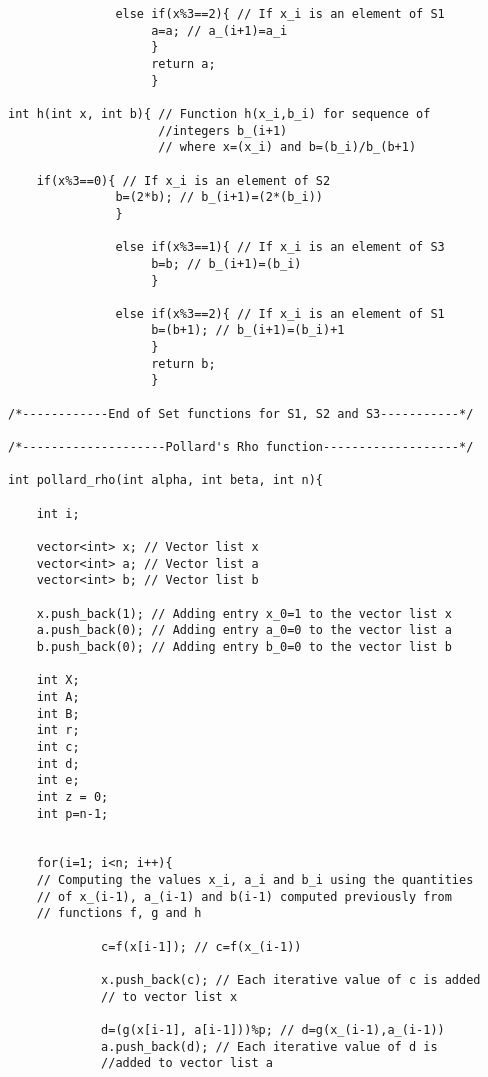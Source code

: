 \documentclass[iwp,first]{luthesis}
\begin{document}
\begin{verbatim}
               else if(x%3==2){ // If x_i is an element of S1
                    a=a; // a_(i+1)=a_i
                    } 
                    return a;      
                    }
                    
int h(int x, int b){ // Function h(x_i,b_i) for sequence of 
                     //integers b_(i+1)
                     // where x=(x_i) and b=(b_i)/b_(b+1)
    
    if(x%3==0){ // If x_i is an element of S2
               b=(2*b); // b_(i+1)=(2*(b_i))
               }
               
               else if(x%3==1){ // If x_i is an element of S3
                    b=b; // b_(i+1)=(b_i)
                    }
                    
               else if(x%3==2){ // If x_i is an element of S1
                    b=(b+1); // b_(i+1)=(b_i)+1
                    }
                    return b;
                    }
                                   
/*------------End of Set functions for S1, S2 and S3-----------*/

/*--------------------Pollard's Rho function-------------------*/

int pollard_rho(int alpha, int beta, int n){ 
    
    int i;
    
    vector<int> x; // Vector list x
    vector<int> a; // Vector list a
    vector<int> b; // Vector list b
    
    x.push_back(1); // Adding entry x_0=1 to the vector list x
    a.push_back(0); // Adding entry a_0=0 to the vector list a
    b.push_back(0); // Adding entry b_0=0 to the vector list b
    
    int X;
    int A;
    int B;
    int r;
    int c;
    int d;
    int e;
    int z = 0;
    int p=n-1;
    
    
    for(i=1; i<n; i++){
    // Computing the values x_i, a_i and b_i using the quantities 
    // of x_(i-1), a_(i-1) and b(i-1) computed previously from  
    // functions f, g and h         
             
             c=f(x[i-1]); // c=f(x_(i-1))
             
             x.push_back(c); // Each iterative value of c is added 
             // to vector list x
             
             d=(g(x[i-1], a[i-1]))%p; // d=g(x_(i-1),a_(i-1))
             a.push_back(d); // Each iterative value of d is 
             //added to vector list a
             

\end{verbatim}
\end{document}
